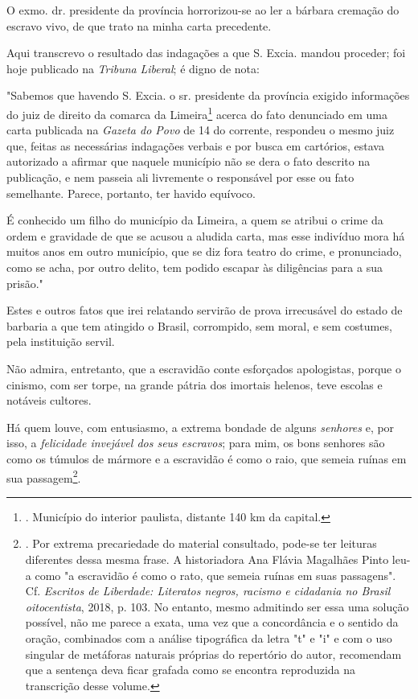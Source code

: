 O exmo. dr. presidente da província horrorizou-se ao ler a bárbara
cremação do escravo vivo, de que trato na minha carta precedente.

Aqui transcrevo o resultado das indagações a que S. Excia. mandou
proceder; foi hoje publicado na \emph{Tribuna} \emph{Liberal}; é digno
de nota:

"Sabemos que havendo S. Excia. o sr. presidente da província exigido
informações do juiz de direito da comarca da Limeira\footnote{.
  Município do interior paulista, distante 140 km da capital.} acerca do
fato denunciado em uma carta publicada na \emph{Gazeta do Povo} de 14 do
corrente, respondeu o mesmo juiz que, feitas as necessárias indagações
verbais e por busca em cartórios, estava autorizado a afirmar que
naquele município não se dera o fato descrito na publicação, e nem
passeia ali livremente o responsável por esse ou fato semelhante.
Parece, portanto, ter havido equívoco.

É conhecido um filho do município da Limeira, a quem se atribui o crime
da ordem e gravidade de que se acusou a aludida carta, mas esse
indivíduo mora há muitos anos em outro município, que se diz fora teatro
do crime, e pronunciado, como se acha, por outro delito, tem podido
escapar às diligências para a sua prisão."

Estes e outros fatos que irei relatando servirão de prova irrecusável do
estado de barbaria a que tem atingido o Brasil, corrompido, sem moral, e
sem costumes, pela instituição servil.

Não admira, entretanto, que a escravidão conte esforçados apologistas,
porque o cinismo, com ser torpe, na grande pátria dos imortais helenos,
teve escolas e notáveis cultores.

Há quem louve, com entusiasmo, a extrema bondade de alguns
\emph{senhores} e, por isso, a \emph{felicidade invejável dos seus
escravos}; para mim, os bons senhores são como os túmulos de mármore e a
escravidão é como o raio, que semeia ruínas em sua passagem\footnote{.
  Por extrema precariedade do material consultado, pode-se ter leituras
  diferentes dessa mesma frase. A historiadora Ana Flávia Magalhães
  Pinto leu-a como "a escravidão é como o rato, que semeia ruínas em
  suas passagens". Cf. \emph{Escritos de Liberdade: Literatos negros,
  racismo e cidadania no Brasil oitocentista}, 2018, p. 103. No entanto,
  mesmo admitindo ser essa uma solução possível, não me parece a exata,
  uma vez que a concordância e o sentido da oração, combinados com a
  análise tipográfica da letra "t" e "i" e com o uso singular de
  metáforas naturais próprias do repertório do autor, recomendam que a
  sentença deva ficar grafada como se encontra reproduzida na
  transcrição desse volume.}.

